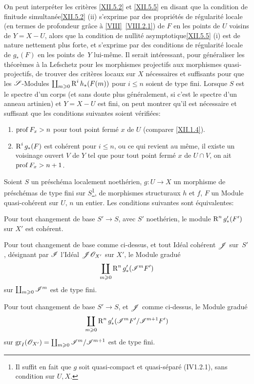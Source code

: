 \begin{remarque} \label{XII.5.6}
On peut interpr\'eter les crit\`eres \ref{XII.5.2} et \ref{XII.5.5} en disant que la \og condition de finitude simultan\'ee\fg \ref{XII.5.2} (ii) s'exprime par des propri\'et\'es de r\'egularit\'e locale (en termes de profondeur gr\^ace \`a \ref{VIII}~\ref{VIII.2.1}) de $F$ en les points de $U$ voisins de $Y=X- U$, alors que la \og condition de nullit\'e asymptotique\fg \ref{XII.5.5} (i) est de nature nettement plus forte, et s'exprime par des conditions de r\'egularit\'e locale de $g_\ast(F)$ en les points de~$Y$ lui-m\^eme. Il serait int\'eressant, pour g\'en\'eraliser les th\'eor\`emes \`a la Lefschetz pour les morphismes projectifs aux morphismes quasi-projectifs, de trouver des crit\`eres locaux sur $X$ n\'ecessaires et suffisants pour que les ${\mathscr S}$-Modules $\coprod_{m\geqslant 0} \operatorname{R}^ih_\ast(F(m))$ pour $i\leq n$ soient de type fini. Lorsque $S$ est le spectre d'un corps (et sans doute plus g\'en\'eralement, si c'est le spectre d'un anneau artinien) et $Y=X- U$ est fini, on peut montrer qu'il est n\'ecessaire et suffisant que les conditions suivantes soient v\'erifi\'ees:
\begin{enumerate}
\item[\textup{1\noo)}] $\operatorname{prof} F_x >n$ pour tout point ferm\'e $x$ de $U$ (comparer \ref{XII.1.4}).
\item[\textup{2\noo)}] $\operatorname{R}^ig_\ast(F)$ est coh\'erent pour $i\leq n$, ou ce qui revient au m\^eme, il existe un voisinage ouvert $V$ de $Y$ tel que pour tout point ferm\'e $x$ de $U\cap V$, on ait $\operatorname{prof} F_x >n+1$.
\end{enumerate}
\end{remarque}

\begin{proposition} \label{XII.5.7}
Soient $S$ un pr\'esch\'ema localement noeth\'erien, $g:U\to X$ un morphisme de pr\'esch\'emas de type fini sur $S$\footnote{Il suffit en fait que $g$ soit quasi-compact et quasi-s\'epar\'e (\textup{\EGA IV1.2.1}), sans condition sur $U, X$.}, de morphismes structuraux $h$ et $f$, $F$ un Module quasi-coh\'erent sur $U$, $n$ un entier. Les conditions suivantes sont \'equivalentes:
\begin{enumeratei}
\item
Pour tout changement de base $S'\to S$, avec $S'$ noeth\'erien, le module $\operatorname{R}^ng'_\ast(F')$ sur $X'$ est coh\'erent.
\item
Pour tout changement de base comme ci-dessus, et tout Id\'eal coh\'erent ${\mathscr J}$ sur~$S'$, d\'esignant par ${\mathscr I}$ l'Id\'eal ${\mathscr J}{\mathscr O}_{X'}$ sur $X'$, le Module gradu\'e
\[
\coprod_{m\geqslant 0} \operatorname{R}^ng'_\ast({\mathscr I}^mF')
\]
sur $\coprod_{m\geqslant 0} {\mathscr I}^m$ est de type fini.
\item
Pour tout changement de base $S'\to S$, et ${\mathscr J}$ comme ci-dessus, le Module gradu\'e
\[
\coprod_{m\geqslant 0} \operatorname{R}^ng'_\ast({\mathscr I}^mF'/{\mathscr I}^{m+1}F')
\]
sur $\operatorname{gr}_I({\mathscr O}_{X'})=\coprod_{m\geqslant 0} {\mathscr I}^m/{\mathscr I}^{m+1}$ est de type fini.
\end{enumeratei}
\end{proposition}


